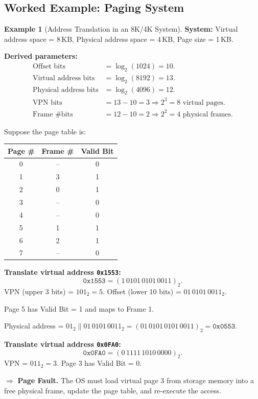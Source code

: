 \documentclass[11pt, a4paper, notitlepage]{report}
\theoremstyle{definition}
\theoremstyle{remark}
\theoremstyle{definition}
\newtheorem{example}[theorem]{Example}
\begin{document}
\subsection{Worked Example: Paging System}
\label{sec:paging-example}

\begin{example}[Address Translation in an 8K/4K System]
  \label{ex:paging1}
  \textbf{System:} Virtual address space = 8\,KB, Physical address space = 4\,KB, Page size = 1\,KB.

  \textbf{Derived parameters:}
  \begin{align*}
    \text{Offset bits} &= \log_2(1024) = 10. \\
    \text{Virtual address bits} &= \log_2(8192) = 13. \\
    \text{Physical address bits} &= \log_2(4096) = 12. \\
    \text{VPN bits} &= 13 - 10 = 3 \Rightarrow 2^3 = 8 \text{ virtual pages.} \\
    \text{Frame \# bits} &= 12 - 10 = 2 \Rightarrow 2^2 = 4 \text{ physical frames.}
  \end{align*}

  Suppose the page table is:

  \begin{center}
  \renewcommand{\arraystretch}{1.2}
  \begin{tabular}{ccc}
    \toprule
    \textbf{Page \#} & \textbf{Frame \#} & \textbf{Valid Bit} \\
    \midrule
    0 & -- & 0 \\
    1 & 3  & 1 \\
    2 & 0  & 1 \\
    3 & -- & 0 \\
    4 & -- & 0 \\
    5 & 1  & 1 \\
    6 & 2  & 1 \\
    7 & -- & 0 \\
    \bottomrule
  \end{tabular}
  \end{center}

  \textbf{Translate virtual address \texttt{0x1553}:}
  \[
    \texttt{0x1553} = (1\,0101\,0101\,0011)_2.
  \]
  VPN (upper 3 bits) = $101_2 = 5$. Offset (lower 10 bits) = $01\,0101\,0011_2$.

  Page 5 has Valid Bit = 1 and maps to Frame 1.

  Physical address = $01_2 \| 01\,0101\,0011_2 = (01\,0101\,0101\,0011)_2 = \texttt{0x0553}$.

  \textbf{Translate virtual address \texttt{0x0FA0}:}
  \[
    \texttt{0x0FA0} = (0\,1111\,1010\,0000)_2.
  \]
  VPN = $011_2 = 3$. Page 3 has Valid Bit = 0.

  $\Rightarrow$ \textbf{Page Fault.} The OS must load virtual page 3 from storage memory into a free physical frame, update the page table, and re-execute the access.
\end{example}
\end{document}
